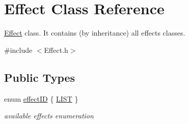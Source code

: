 \hypertarget{class_effect}{}\section{Effect Class Reference}
\label{class_effect}


\hyperlink{class_effect}{Effect} class. It contains (by inheritance) all effects classes.  




{\ttfamily \#include $<$Effect.\+h$>$}

\subsection*{Public Types}
\begin{DoxyCompactItemize}
\item 
enum \hyperlink{class_effect_a6422fe21e9e452943fbc3344884a6fed}{effect\+ID} \{ \hyperlink{class_effect_a6422fe21e9e452943fbc3344884a6fedae2be861676276fd732d86f36e663295a}{L\+I\+ST}
 \}\begin{DoxyCompactList}\small\item\em available effects enumeration \end{DoxyCompactList}
\end{DoxyCompactItemize}
